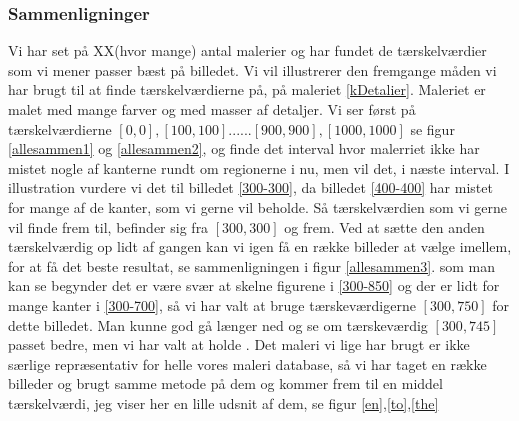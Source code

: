 \subsubsection{Sammenligninger}
Vi har set på XX(hvor mange) antal malerier og har fundet de
tærskelværdier som vi mener passer bæst på billedet. Vi vil illustrerer
den fremgange måden vi har brugt til at finde tærskelværdierne på, på
maleriet \ref{kDetalier}. Maleriet er malet med mange farver og med
masser af detaljer. Vi ser først på tærskelværdierne
$[0,0],[100,100]......[900,900],[1000,1000]$ se figur \ref{allesammen1}
og \ref{allesammen2}, og finde det interval hvor malerriet ikke har
mistet nogle af kanterne rundt om regionerne i nu, men vil det, i næste
interval. I illustration vurdere vi det til billedet \ref{300-300}, da
billedet \ref{400-400} har mistet for mange af de kanter, som vi gerne
vil beholde. Så tærskelværdien som vi gerne vil finde frem til, befinder
sig fra $[300,300]$ og frem. Ved at sætte den anden tærskelværdig op
lidt af gangen kan vi igen få en række billeder at vælge imellem, for at
få det beste resultat, se sammenligningen i figur \ref{allesammen3}. som
man kan se begynder det er være svær at skelne figurene i \ref{300-850}
og der er lidt for mange kanter i \ref{300-700}, så vi har valt at bruge
tærskeværdigerne $[300,750]$ for dette billedet. Man kunne god gå længer
ned og se om tærskeværdig $[300,745]$ passet bedre, men vi har valt at
holde . Det maleri vi lige har brugt er ikke særlige repræsentativ for
helle vores maleri database, så vi har taget en række billeder og brugt
samme metode på dem og kommer frem til en middel tærskelværdi, jeg viser
her en lille udsnit af dem, se figur \ref{en},\ref{to},\ref{the}

